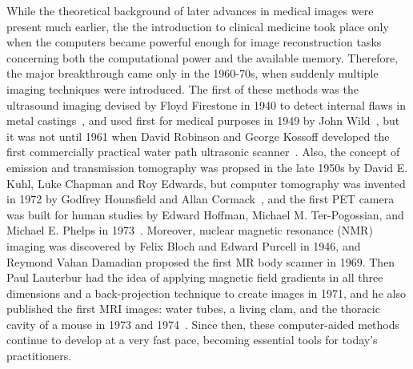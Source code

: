 While the theoretical background of later advances in medical images were present much earlier, the the introduction to clinical medicine took place only when the computers became powerful enough for image reconstruction tasks concerning both the computational power and the available memory. Therefore, the major breakthrough came only in the 1960-70s, when suddenly multiple imaging techniques were introduced. The first of these methods was the ultrasound imaging devised by Floyd Firestone in 1940 to detect internal flaws in metal castings~\cite{singh_origin_2007}, and used first for medical purposes in 1949 by John Wild~\cite{watts_john_2009}, but it was not until 1961 when David Robinson and George Kossoff developed the first commercially practical water path ultrasonic scanner~\cite{griffiths_historical_nodate}. Also, the concept of emission and transmission tomography was propsed in the late 1950s by David E. Kuhl, Luke Chapman and Roy Edwards, but computer tomography was invented in 1972 by Godfrey Hounsfield and Allan Cormack~\cite{richmond_sir_2004}, and the first PET camera was built for human studies by Edward Hoffman, Michael M. Ter-Pogossian, and Michael E. Phelps in 1973~\cite{noauthor_us_nodate}. Moreover, nuclear magnetic resonance (NMR) imaging was discovered by Felix Bloch and Edward Purcell in 1946, and Reymond Vahan Damadian proposed the first MR body scanner in 1969. Then Paul Lauterbur had the idea of applying magnetic field gradients in all three dimensions and a back-projection technique to create images in 1971, and he also published the first MRI images: water tubes, a living clam, and the thoracic cavity of a mouse in 1973 and 1974~\cite{rinck_short_2008}. Since then, these computer-aided methods continue to develop at a very fast pace, becoming essential tools for today's practitioners.

